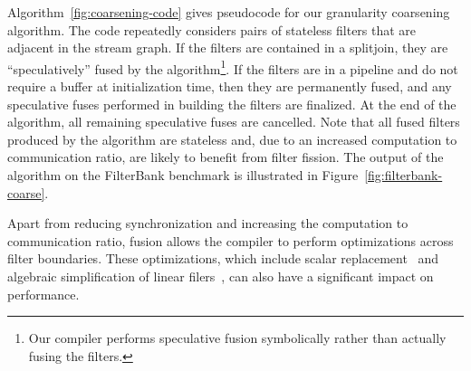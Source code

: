 Algorithm~\ref{fig:coarsening-code} gives pseudocode for our granularity
coarsening algorithm.  The code repeatedly considers pairs of
stateless filters that are adjacent in the stream graph.  If the
filters are contained in a splitjoin, they are ``speculatively'' fused
by the algorithm\footnote{Our compiler performs speculative fusion
symbolically rather than actually fusing the filters.}.  
If the filters are in a pipeline and do not require a buffer at
initialization time, then they are permanently fused, and any
speculative fuses performed in building the filters are finalized.  At
the end of the algorithm, all remaining speculative fuses are
cancelled.  Note that all fused filters produced by the algorithm are
stateless and, due to an increased computation to communication ratio,
are likely to benefit from filter fission.  The output of the
algorithm on the FilterBank benchmark is illustrated in
Figure~\ref{fig:filterbank-coarse}.

Apart from reducing synchronization and increasing the computation to
communication ratio, fusion allows the compiler to perform
optimizations across filter boundaries.  These optimizations, which
include scalar replacement~\cite{sermulins05lctes} and algebraic
simplification of linear filers~\cite{lamb03pldi,agrawal05cases}, can
also have a significant impact on performance.




